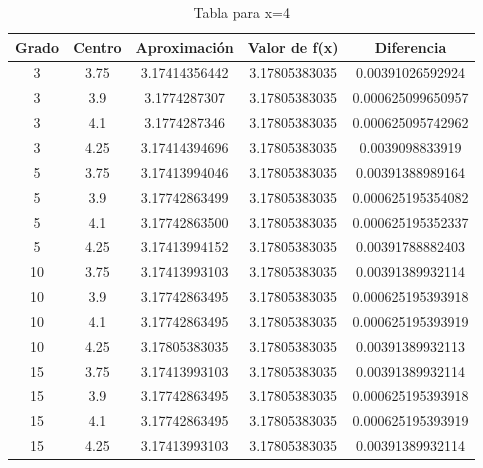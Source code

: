 \documentclass[a4paper,12pt]{report}
\begin{document}
\clearpage

\begin{table}[htb]
\begin{center}
  \caption{Tabla para x=4}
  \begin{tabular}{|c|c|c|c|c|} %
  \hline
         Grado  &  Centro  &  Aproximación    &  Valor de f(x)  &  Diferencia         \\ \hline
            3   &   3.75   &  3.17414356442   &  3.17805383035  &  0.00391026592924   \\ \hline
            3   &   3.9    &  3.1774287307    &  3.17805383035  &  0.000625099650957  \\ \hline
            3   &   4.1    &  3.1774287346    &  3.17805383035  &  0.000625095742962  \\ \hline
            3   &   4.25   &  3.17414394696   &  3.17805383035  &  0.0039098833919    \\ \hline
            5   &   3.75   &  3.17413994046   &  3.17805383035  &  0.00391388989164   \\ \hline
            5   &   3.9    &  3.17742863499   &  3.17805383035  &  0.000625195354082  \\ \hline
            5   &   4.1    &  3.17742863500   &  3.17805383035  &  0.000625195352337  \\ \hline
            5   &   4.25   &  3.17413994152   &  3.17805383035  &  0.00391788882403   \\ \hline
            10  &   3.75   &  3.17413993103   &  3.17805383035  &  0.00391389932114   \\ \hline
            10  &   3.9    &  3.17742863495   &  3.17805383035  &  0.000625195393918  \\ \hline
            10  &   4.1    &  3.17742863495   &  3.17805383035  &  0.000625195393919  \\ \hline
            10  &   4.25   &  3.17805383035   &  3.17805383035  &  0.00391389932113   \\ \hline
            15  &   3.75   &  3.17413993103   &  3.17805383035  &  0.00391389932114   \\ \hline
            15  &   3.9    &  3.17742863495   &  3.17805383035  &  0.000625195393918  \\ \hline
            15  &   4.1    &  3.17742863495   &  3.17805383035  &  0.000625195393919  \\ \hline
            15  &   4.25   &  3.17413993103   &  3.17805383035  &  0.00391389932114   \\ \hline
   \end{tabular}
   \label{Tabla3}
   \end{center}
\end{table}
\end{document}
